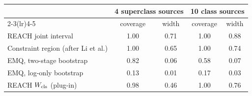 \begin{tabular}{lcccc}
\toprule
 & \multicolumn{2}{c}{4 superclass sources} & \multicolumn{2}{c}{10 class sources} \\
\cmidrule(lr){2-3}\cmidrule(lr){4-5}
 & coverage & width & coverage & width \\
\midrule
REACH joint interval & 1.00 & 0.71 & 1.00 & 0.88 \\
Constraint region (after Li et al.) & 1.00 & 0.65 & 1.00 & 0.74 \\
EMQ, two-stage bootstrap & 0.82 & 0.06 & 0.58 & 0.07 \\
EMQ, log-only bootstrap & 0.13 & 0.01 & 0.17 & 0.03 \\
REACH $W_{\mathrm{cls}}$ (plug-in) & 0.98 & 0.46 & 1.00 & 0.76 \\
\bottomrule
\end{tabular}
